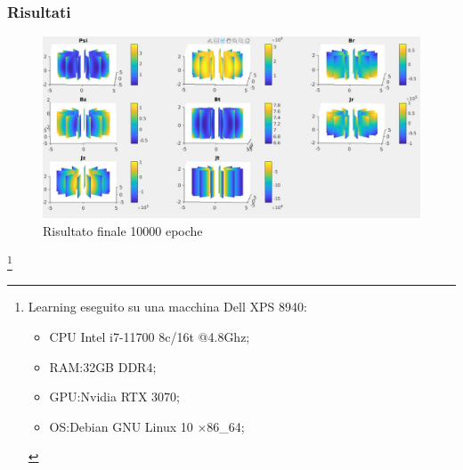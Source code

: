 \documentclass{beamer}
\begin{document}
\begin{frame}
	\frametitle{Risultati}
	\begin{figure}
		\includegraphics[scale=0.26]{2022-06-20-23-07-41.png}%
		\caption{Risultato finale 10000 epoche}
	\end{figure}
	\vspace{-1cm}
\footnote{\scriptsize
Learning eseguito su una macchina Dell XPS 8940:\\
		\begin{itemize}
			\item CPU Intel i7-11700 8c/16t @4.8Ghz;%
			\item RAM:32GB DDR4;
			\item GPU:Nvidia RTX 3070;%
			\item OS:Debian GNU Linux 10 \(\times \)86\_64;%
		\end{itemize}
}
\end{frame}
\end{document}
